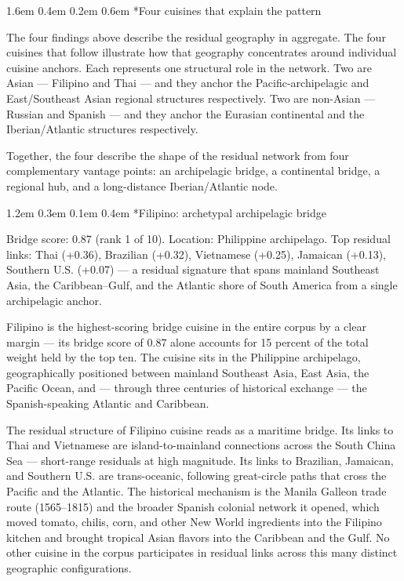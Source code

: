 \documentclass[11pt]{article}
\makeatletter
\renewcommand\section{\@startsection{section}{1}{\z@}%
  {1.6em \@plus 0.4em \@minus 0.2em}%
  {0.6em}%
  {\normalfont\Large\bfseries\color{black!85}}}
\renewcommand\subsection{\@startsection{subsection}{2}{\z@}%
  {1.2em \@plus 0.3em \@minus 0.1em}%
  {0.4em}%
  {\normalfont\large\bfseries\itshape\color{black!75}}}
\makeatother
\begin{document}
\section*{Four cuisines that explain the pattern}


The four findings above describe the residual geography in aggregate. The four cuisines that follow illustrate how that geography concentrates around individual cuisine anchors. Each represents one structural role in the network. Two are Asian — Filipino and Thai — and they anchor the Pacific-archipelagic and East/Southeast Asian regional structures respectively. Two are non-Asian — Russian and Spanish — and they anchor the Eurasian continental and the Iberian/Atlantic structures respectively.


Together, the four describe the shape of the residual network from four complementary vantage points: an archipelagic bridge, a continental bridge, a regional hub, and a long-distance Iberian/Atlantic node.


\subsection*{Filipino: archetypal archipelagic bridge}


Bridge score: 0.87 (rank 1 of 10). Location: Philippine archipelago. Top residual links: Thai (+0.36), Brazilian (+0.32), Vietnamese (+0.25), Jamaican (+0.13), Southern U.S. (+0.07) — a residual signature that spans mainland Southeast Asia, the Caribbean–Gulf, and the Atlantic shore of South America from a single archipelagic anchor.


Filipino is the highest-scoring bridge cuisine in the entire corpus by a clear margin — its bridge score of 0.87 alone accounts for 15 percent of the total weight held by the top ten. The cuisine sits in the Philippine archipelago, geographically positioned between mainland Southeast Asia, East Asia, the Pacific Ocean, and — through three centuries of historical exchange — the Spanish-speaking Atlantic and Caribbean.


The residual structure of Filipino cuisine reads as a maritime bridge. Its links to Thai and Vietnamese are island-to-mainland connections across the South China Sea — short-range residuals at high magnitude. Its links to Brazilian, Jamaican, and Southern U.S. are trans-oceanic, following great-circle paths that cross the Pacific and the Atlantic. The historical mechanism is the Manila Galleon trade route (1565–1815) and the broader Spanish colonial network it opened, which moved tomato, chilis, corn, and other New World ingredients into the Filipino kitchen and brought tropical Asian flavors into the Caribbean and the Gulf. No other cuisine in the corpus participates in residual links across this many distinct geographic configurations.
\end{document}
